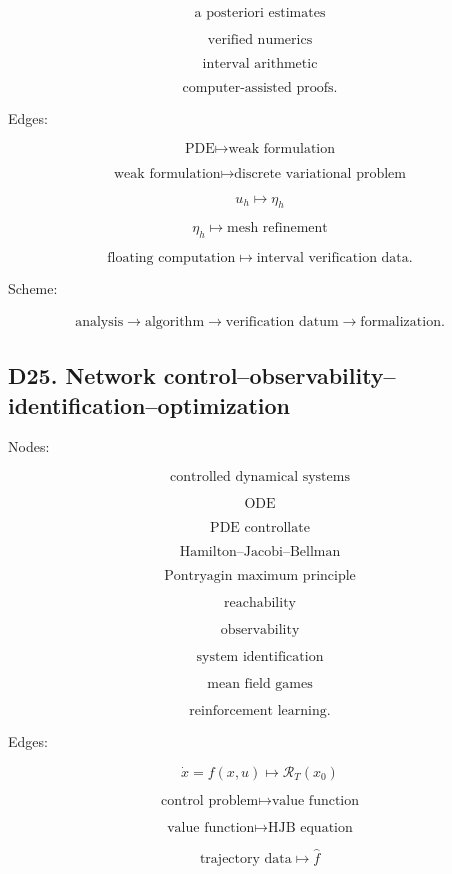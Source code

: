\documentclass[11pt]{article}
\begin{document}
\[
\text{a posteriori estimates}
\]

\[
\text{verified numerics}
\]

\[
\text{interval arithmetic}
\]

\[
\text{computer-assisted proofs}.
\]

Edges:

\[
\text{PDE}\mapsto \text{weak formulation}
\]

\[
\text{weak formulation}\mapsto \text{discrete variational problem}
\]

\[
u_h\mapsto \eta_h
\]

\[
\eta_h\mapsto \text{mesh refinement}
\]

\[
\text{floating computation}\mapsto \text{interval verification data}.
\]

Scheme:

\[
\begin{gathered}
\text{analysis} \to \text{algorithm} \to \text{verification datum} \to \text{formalization}.
\end{gathered}
\]



\subsection{D25. Network control--observability--identification--optimization}

Nodes:

\[
\text{controlled dynamical systems}
\]

\[
\text{ODE}
\]

\[
\text{PDE controllate}
\]

\[
\text{Hamilton--Jacobi--Bellman}
\]

\[
\text{Pontryagin maximum principle}
\]

\[
\text{reachability}
\]

\[
\text{observability}
\]

\[
\text{system identification}
\]

\[
\text{mean field games}
\]

\[
\text{reinforcement learning}.
\]

Edges:

\[
\dot x=f(x,u)\mapsto \mathcal R_T(x_0)
\]

\[
\text{control problem}\mapsto \text{value function}
\]

\[
\text{value function}\mapsto \text{HJB equation}
\]

\[
\text{trajectory data}\mapsto \hat f
\]
\end{document}
